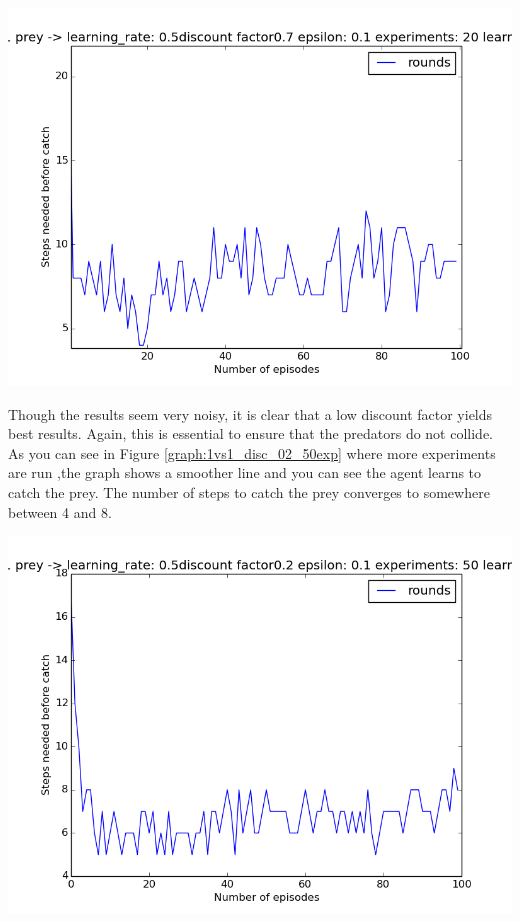 \begin{center}
	\includegraphics[scale=0.3]{minimax_100rounds_20exp_disc07_alpha05}
	\label{graph:1vs1_disc_07}
\end{center}

Though the results seem very noisy, it is clear that a low discount factor yields best results. Again, this is essential to ensure that the predators do not collide. As you can see in Figure \ref{graph:1vs1_disc_02_50exp} where more experiments are run ,the graph shows a smoother line and you can see the agent learns to catch the prey. The number of steps to catch the prey converges to somewhere between 4 and 8.  

\begin{center}
	\includegraphics[scale=0.3]{minimax_gridsize5_100round_50exp_disc02_learningrate_05}
	\label{graph:1vs1_disc_02_50exp}
\end{center}


